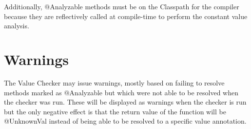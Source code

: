 Additionally, @Analyzable methods must be on the Classpath for the
compiler because they are reflectively called at compile-time to
perform the constant value analysis.

\section{Warnings}
The Value Checker may issue warnings, mostly based on failing to
resolve methods marked as @Analyzable but which were not able to be
resolved when the checker was run. These will be displayed as warnings when
the checker is run but the only negative effect is that the return
value of the function will be @UnknownVal instead of being able to be
resolved to a specific value annotation.


